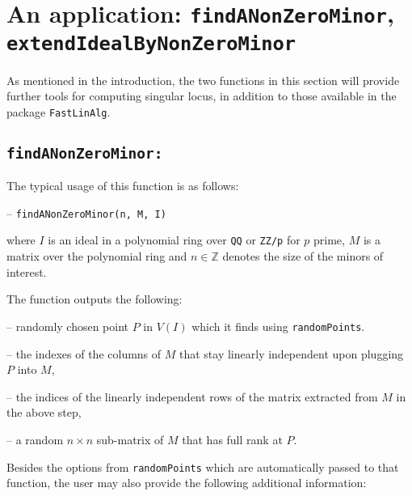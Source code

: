 \documentclass[11pt]{amsart}
\theoremstyle{definition}
\begin{document}




\section{An application:  {\tt findANonZeroMinor}, {\tt extendIdealByNonZeroMinor}}

As mentioned in the introduction, the two functions in this section will provide further tools for computing singular locus, in addition to those available in the package {\tt FastLinAlg}. 

\subsection{\tt findANonZeroMinor:}\label{findANonZeroMinor} The typical usage of this function is as follows: 

\vspace{0.5em}
-- {\tt findANonZeroMinor(n, M, I)} 
\vspace{0.5em}

\noindent where $I$ is an ideal
in a polynomial ring over {\tt QQ} or {\tt ZZ/p} for $p$ prime, $M$ is a matrix
over the polynomial ring and $n\in \mathbb{Z}$ denotes the size of the minors of interest.


The function outputs the following:

-- randomly chosen point $P$ in $V(I)$ which it finds using {\tt randomPoints}.

-- the indexes of the columns of $M$ that stay linearly independent upon plugging $P$ into $M$, 

-- the indices of the linearly independent rows of the matrix extracted from $M$ in the above step, 

-- a random $n\times n$ sub-matrix of $M$ that has full rank at $P$.

Besides the options from {\tt randomPoints} which are automatically passed to that function, the user may also provide the following additional information: 
\end{document}
